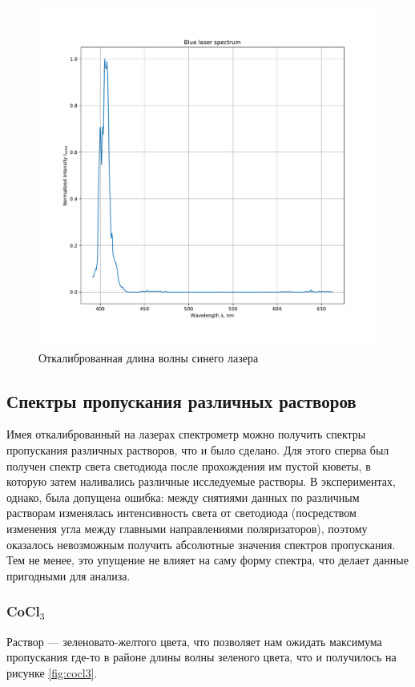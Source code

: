 \documentclass[a4paper, 12pt]{article}
\begin{document}
\begin{figure}[H]
	\centering
	\includegraphics[width=0.7\linewidth]{bluelaser}
	\caption{Откалиброванная длина волны синего лазера }
	\label{fig:bluelaser}
\end{figure}

\subsection{Спектры пропускания различных растворов}

Имея откалиброванный на лазерах спектрометр можно получить спектры пропускания различных растворов, что и было сделано. Для этого сперва был получен спектр света светодиода после прохождения им пустой кюветы, в которую затем наливались различные исследуемые растворы. В экспериментах, однако, была допущена ошибка: между снятиями данных по различным растворам изменялась интенсивность света от светодиода (посредством изменения угла между главными направлениями поляризаторов), поэтому оказалось невозможным получить абсолютные значения спектров пропускания. Тем не менее, это упущение не влияет на саму форму спектра, что делает данные пригодными для анализа.

\subsubsection{CoCl$_3$}

Раствор  --- зеленовато-желтого цвета, что позволяет нам ожидать максимума пропускания где-то в районе длины волны зеленого цвета, что и получилось на рисунке \ref{fig:cocl3}.
\end{document}
